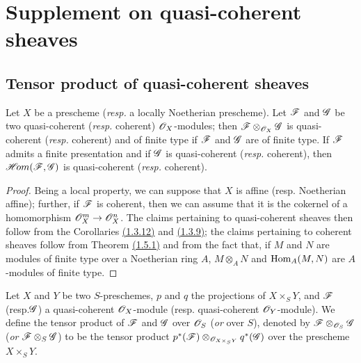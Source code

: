 \section{Supplement on quasi-coherent sheaves}
\label{section-supplement-on-qcoh}

\subsection{Tensor product of quasi-coherent sheaves}
\label{subsection-tensor-product-of-qcoh}

\begin{prop}[9.1.1]
\label{prop-1.9.1.1}
Let $X$ be a prescheme ({\it resp.} a locally Noetherian prescheme). Let $\mathscr{F}$ and
$\mathscr{G}$ be two quasi-coherent ({\it resp.} coherent) $\mathscr{O}_X$-modules; then
$\mathscr{F}\otimes_{\mathscr{O}_X}\mathscr{G}$ is quasi-coherent ({\it resp.} coherent) and
of finite type if $\mathscr{F}$ and $\mathscr{G}$ are of finite type. If
$\mathscr{F}$ admits a finite presentation and if $\mathscr{G}$ is quasi-coherent
({\it resp.} coherent), then $\mathscr{H}\!{om}(\mathscr{F},\mathscr{G})$ is quasi-coherent
({\it resp.} coherent).
\end{prop}

\begin{proof}
\label{proof-prop-1.9.1.1}
Being a local property, we can suppose that $X$ is affine (resp. Noetherian
affine); further, if $\mathscr{F}$ is coherent, then we can assume that it is the
cokernel of a homomorphism $\mathscr{O}_X^m\to\mathscr{O}_X^n$. The claims pertaining to
quasi-coherent sheaves then follow from the Corollaries \hyperref[cor-1.1.3.12]{(1.3.12)} and \hyperref[cor-1.1.3.9]{(1.3.9)}; the
claims pertaining to coherent sheaves follow from Theorem \hyperref[thm-1.1.5.1]{(1.5.1)} and from the fact
that, if $M$ and $N$ are modules of finite type over a Noetherian ring $A$,
$M\otimes_A N$ and ${\mathop{\mathrm{Hom}}\nolimits}_A(M,N)$ are $A$-modules of finite type.
\end{proof}

\begin{defn}[9.1.2]
\label{defn-1.9.1.2}
Let $X$ and $Y$ be two $S$-preschemes, $p$ and
$q$ the projections of $X\times_S Y$, and $\mathscr{F}$ (resp.$\mathscr{G}$) a
quasi-coherent $\mathscr{O}_X$-module (resp. quasi-coherent $\mathscr{O}_Y$-module). We define the
tensor product of $\mathscr{F}$ and $\mathscr{G}$ over $\mathscr{O}_S$ ({\it or} over $S$),
denoted by $\mathscr{F}\otimes_{\mathscr{O}_S}\mathscr{G}$ ({\it or}
$\mathscr{F}\otimes_S\mathscr{G}$) to be the tensor product
$p^*(\mathscr{F})\otimes_{\mathscr{O}_{X\times_S Y}}q^*(\mathscr{G})$ over the
prescheme $X\times_S Y$.
\end{defn}

